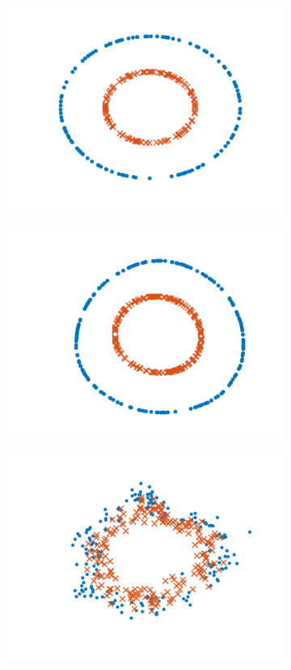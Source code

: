 \documentclass[letterpaper]{article} %
\begin{document}
\begin{figure}[ht]

\centering
\begin{subfigure}[b]{0.38\columnwidth}
  \centering
	{\includegraphics[width=0.85\columnwidth]{circleLatentEmbedding_groundTruth.png}}
  \caption{}
	\label{subfig:circleTrain}
\end{subfigure}
\begin{subfigure}[b]{0.38\columnwidth}
  \centering
	{\includegraphics[width=0.85\columnwidth]{circleLatentEmbedding_AE.png}}
  \caption{}
	\label{subfig:circleLatent}
\end{subfigure}
\begin{subfigure}[b]{0.38\columnwidth}
  \centering
	\includegraphics[width=0.85\columnwidth]{circleLatentEmbedding_vae.png}

\end{subfigure}
\end{figure}
\end{document}
